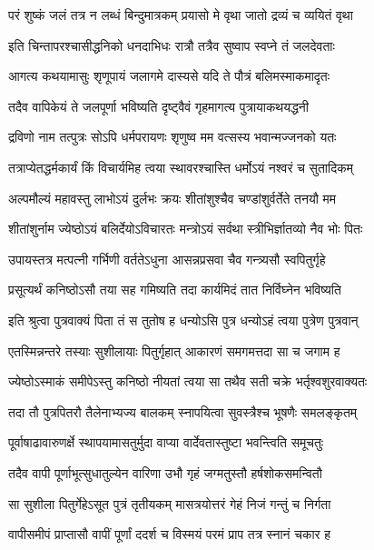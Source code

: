 \twolineshloka
{परं शुष्कं जलं तत्र न लब्धं बिन्दुमात्रकम्}
{प्रयासो मे वृथा जातो द्रव्यं च व्ययितं वृथा} %

\twolineshloka
{इति चिन्तापरश्चासीद्धनिको धनदाभिधः}
{रात्रौ तत्रैव सुष्वाप स्वप्ने तं जलदेवताः} %

\twolineshloka
{आगत्य कथयामासुः शृणूपायं जलागमे}
{दास्यसे यदि ते पौत्रं बलिमस्माकमादृतः} %

\twolineshloka
{तदैव वापिकेयं ते जलपूर्णा भविष्यति}
{दृष्ट्वैवं गृहमागत्य पुत्रायाकथयद्धनी} %

\twolineshloka
{द्रविणो नाम तत्पुत्रः सोऽपि धर्मपरायणः}
{शृणुष्व मम वत्सस्य भवान्मज्जनको यतः} %

\twolineshloka
{तत्राप्येतद्धर्मकार्यं किं विचार्यमिह त्वया}
{स्थावरश्चास्ति धर्मोऽयं नश्वरं च सुतादिकम्} %

\twolineshloka
{अल्पमौल्यं महावस्तु लाभोऽयं दुर्लभः क्रयः}
{शीतांशुश्चैव चण्डांशुर्वर्तेते तनयौ मम} %

\twolineshloka
{शीतांशुर्नाम ज्येष्ठोऽयं बलिर्देयोऽविचारतः}
{मन्त्रोऽयं सर्वथा स्त्रीभिर्ज्ञातव्यो नैव भोः पितः} %

\twolineshloka
{उपायस्तत्र मत्पत्नी गर्भिणी वर्ततेऽधुना}
{आसन्नप्रसवा चैव गन्त्र्यसौ स्वपितुर्गृहे} %

\twolineshloka
{प्रसूत्यर्थं कनिष्ठोऽसौ तया सह गमिष्यति}
{तदा कार्यमिदं तात निर्विघ्नेन भविष्यति} %

\twolineshloka
{इति श्रुत्वा पुत्रवाक्यं पिता तं स तुतोष ह}
{धन्योऽसि पुत्र धन्योऽहं त्वया पुत्रेण पुत्रवान्} %

\twolineshloka
{एतस्मिन्नन्तरे तस्याः सुशीलायाः पितुर्गृहात्}
{आकारणं समगमत्तदा सा च जगाम ह} %

\twolineshloka
{ज्येष्ठोऽस्माकं समीपेऽस्तु कनिष्ठो नीयतां त्वया}
{सा तथैव सती चक्रे भर्तृश्वशुरवाक्यतः} %

\twolineshloka
{तदा तौ पुत्रपितरौ तैलेनाभ्यज्य बालकम्}
{स्नापयित्वा सुवस्त्रैश्च भूषणैः समलङ्कृतम्} %

\twolineshloka
{पूर्वाषाढावारुणर्क्षे स्थापयामासतुर्मुदा}
{वाप्या वार्देवतास्तुष्टा भवन्त्विति समूचतुः} %

\twolineshloka
{तदैव वापी पूर्णाभूत्सुधातुल्येन वारिणा}
{उभौ गृहं जग्मतुस्तौ हर्षशोकसमन्वितौ} %

\twolineshloka
{सा सुशीला पितुर्गेहेऽसूत पुत्रं तृतीयकम्}
{मासत्रयोत्तरं गेहं निजं गन्तुं च निर्गता} %

\twolineshloka
{वापीसमीपं प्राप्तासौ वापीं पूर्णां ददर्श च}
{विस्मयं परमं प्राप तत्र स्नानं चकार ह} %


